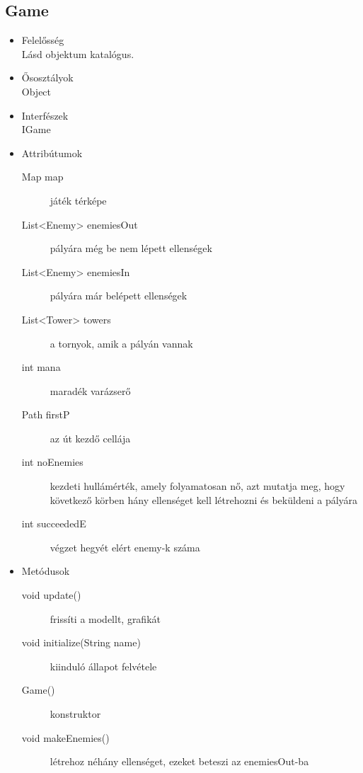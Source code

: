 \subsection{Game}
\begin{itemize}
\item Felelősség\\
Lásd objektum katalógus.
\item Ősosztályok\\
Object
\item Interfészek\\
IGame
\item Attribútumok\\
	\begin{description}
		\item[Map map] játék térképe
\item[List<Enemy> enemiesOut] pályára még be nem lépett ellenségek
\item[List<Enemy> enemiesIn] pályára már belépett ellenségek
\item[List<Tower> towers] a tornyok, amik a pályán vannak
\item[int mana] maradék varázserő
\item[Path firstP] az út kezdő cellája
\item[int noEnemies] kezdeti hullámérték, amely folyamatosan nő, azt mutatja meg, hogy következő körben hány ellenséget kell létrehozni és beküldeni a pályára
\item[int succeededE] végzet hegyét elért enemy-k száma
	\end{description}
	
\item Metódusok\\
	\begin{description}
		\item[void update()] frissíti a modellt, grafikát
\item[void initialize(String name)] kiinduló állapot felvétele
\item[Game()] konstruktor
\item[void makeEnemies()] létrehoz néhány ellenséget, ezeket beteszi az enemiesOut-ba

		
		
	\end{description}
\end{itemize}


